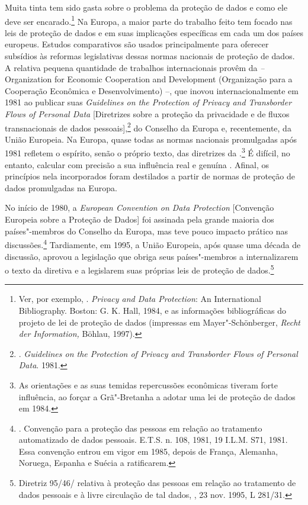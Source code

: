 Muita tinta tem sido gasta sobre o problema da proteção de dados e como
ele deve ser encarado.\footnote{Ver, por exemplo, .
  \emph{Privacy and Data Protection}: An International Bibliography.
  Boston: G. K. Hall, 1984, e as informações bibliográficas do projeto
  de lei de proteção de dados (impressas em Mayer"-Schönberger,
  \emph{Recht der Information,} Böhlau, 1997).} Na Europa, a maior parte
do trabalho feito tem focado nas leis de proteção de dados e em suas
implicações específicas em cada um dos países europeus. Estudos
comparativos são usados principalmente para oferecer subsídios às
reformas legislativas dessas normas nacionais de proteção de dados. A
relativa pequena quantidade de trabalhos internacionais provêm da 
\emph{--} Organization for Economic Cooperation and Development
(Organização para a Cooperação Econômica e Desenvolvimento) --, que
inovou internacionalmente em 1981 ao publicar suas \emph{Guidelines on
the Protection of Privacy and Transborder Flows of Personal Data}
{[}Diretrizes sobre a proteção da privacidade e de fluxos transnacionais
de dados pessoais{]},\footnote{. \emph{Guidelines on the Protection
  of Privacy and Transborder Flows of Personal Data}. 1981.} do Conselho
da Europa e, recentemente, da União Europeia. Na Europa, quase todas as
normas nacionais promulgadas após 1981 refletem o espírito, senão o
próprio texto, das diretrizes da .\footnote{As orientações e as suas
  temidas repercussões econômicas tiveram forte influência, ao forçar a
  Grã"-Bretanha a adotar uma lei de proteção de dados em 1984.} É
difícil, no entanto, calcular com precisão a sua influência real e
genuína . Afinal, os princípios nela incorporados foram destilados a
partir de normas de proteção de dados promulgadas na Europa.

No início de 1980, a \emph{European Convention on Data Protection}
{[}Convenção Europeia sobre a Proteção de Dados{]} foi assinada pela
grande maioria dos países"-membros do Conselho da Europa, mas teve pouco
impacto prático nas discussões.\footnote{. Convenção
  para a proteção das pessoas em relação ao tratamento automatizado de
  dados pessoais. E.T.S. n. 108, 1981, 19 I.L.M. S71, 1981. Essa
  convenção entrou em vigor em 1985, depois de França, Alemanha,
  Noruega, Espanha e Suécia a ratificarem.} Tardiamente, em 1995, a
União Europeia, após quase uma década de discussão, aprovou a legislação
que obriga seus países"-membros a internalizarem o texto da diretiva e a
legislarem suas próprias leis de proteção de dados.\footnote{Diretriz
  95/46/ relativa à proteção das pessoas em relação ao tratamento de
  dados pessoais e à livre circulação de tal dados, , 23 nov. 1995, L
  281/31.}

